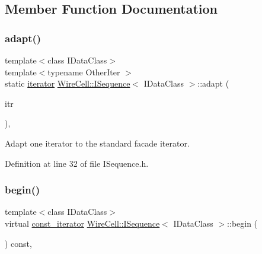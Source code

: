 \subsection{Member Function Documentation}
\mbox{\label{class_wire_cell_1_1_i_sequence_a0049905d5140aca88b0ef1fdf5ecc2ac}} 
\subsubsection{\texorpdfstring{adapt()}{adapt()}}
{\footnotesize\ttfamily template$<$class I\+Data\+Class$>$ \\
template$<$typename Other\+Iter $>$ \\
static \hyperlink{class_wire_cell_1_1_i_sequence_ac9bcf643972944d21c90743d9281f47a}{iterator} \hyperlink{class_wire_cell_1_1_i_sequence}{Wire\+Cell\+::\+I\+Sequence}$<$ I\+Data\+Class $>$\+::adapt (\begin{DoxyParamCaption}\item[{const Other\+Iter \&}]{itr }\end{DoxyParamCaption})\hspace{0.3cm}{\ttfamily [inline]}, {\ttfamily [static]}}



Adapt one iterator to the standard facade iterator. 



Definition at line 32 of file I\+Sequence.\+h.

\mbox{\label{class_wire_cell_1_1_i_sequence_a38e93257d35e23239456ff47ffd6f172}} 
\subsubsection{\texorpdfstring{begin()}{begin()}\hspace{0.1cm}{\footnotesize\ttfamily [1/2]}}
{\footnotesize\ttfamily template$<$class I\+Data\+Class$>$ \\
virtual \hyperlink{class_wire_cell_1_1_i_sequence_a70e983c18db65df4337838592fa9fd9d}{const\+\_\+iterator} \hyperlink{class_wire_cell_1_1_i_sequence}{Wire\+Cell\+::\+I\+Sequence}$<$ I\+Data\+Class $>$\+::begin (\begin{DoxyParamCaption}{ }\end{DoxyParamCaption}) const\hspace{0.3cm}{\ttfamily [inline]}, {\ttfamily [virtual]}}



